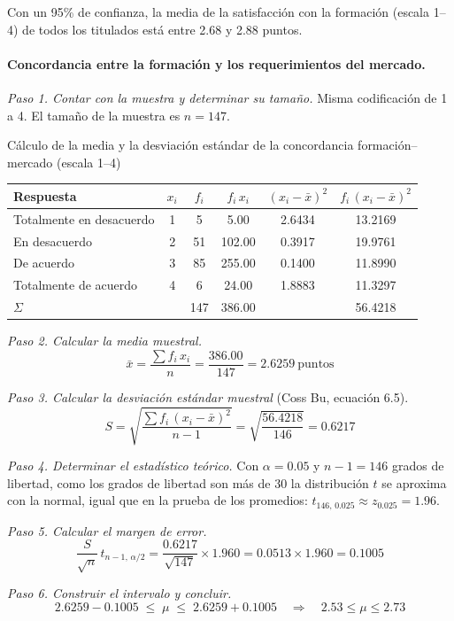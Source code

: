 Con un 95\% de confianza, la media de la satisfacción con la formación (escala 1--4) de todos los titulados está entre 2.68 y 2.88 puntos.

\paragraph{Concordancia entre la formación y los requerimientos del mercado.}

\textit{Paso 1. Contar con la muestra y determinar su tamaño.} Misma codificación de 1 a 4. El tamaño de la muestra es $n = 147$.

\begin{mitabla}{Cálculo de la media y la desviación estándar de la concordancia formación--mercado (escala 1--4)}
\begin{tabular}{lccccc}
\toprule
Respuesta & $x_i$ & $f_i$ & $f_i\,x_i$ & $(x_i-\bar{x})^2$ & $f_i\,(x_i-\bar{x})^2$ \\
\midrule
Totalmente en desacuerdo & 1 & 5 & 5.00 & 2.6434 & 13.2169 \\
En desacuerdo & 2 & 51 & 102.00 & 0.3917 & 19.9761 \\
De acuerdo & 3 & 85 & 255.00 & 0.1400 & 11.8990 \\
Totalmente de acuerdo & 4 & 6 & 24.00 & 1.8883 & 11.3297 \\
\midrule
$\Sigma$ & & 147 & 386.00 & & 56.4218 \\
\bottomrule
\end{tabular}
\end{mitabla}

\textit{Paso 2. Calcular la media muestral.}
\[
\bar{x} = \frac{\sum f_i\,x_i}{n} = \frac{386.00}{147} = 2.6259\ \text{puntos}
\]

\textit{Paso 3. Calcular la desviación estándar muestral} (Coss Bu, ecuación 6.5).
\[
S = \sqrt{\frac{\sum f_i\,(x_i-\bar{x})^2}{n-1}} = \sqrt{\frac{56.4218}{146}} = 0.6217
\]

\textit{Paso 4. Determinar el estadístico teórico.} Con $\alpha = 0.05$ y $n-1 = 146$ grados de libertad, como los grados de libertad son más de 30 la distribución $t$ se aproxima con la normal, igual que en la prueba de los promedios: $t_{146,\,0.025} \approx z_{0.025} = 1.96$.

\textit{Paso 5. Calcular el margen de error.}
\[
\frac{S}{\sqrt{n}}\,t_{n-1,\,\alpha/2} = \frac{0.6217}{\sqrt{147}}\times 1.960 = 0.0513 \times 1.960 = 0.1005
\]

\textit{Paso 6. Construir el intervalo y concluir.}
\[
2.6259 - 0.1005 \;\le\; \mu \;\le\; 2.6259 + 0.1005 \quad\Longrightarrow\quad 2.53 \le \mu \le 2.73
\]

